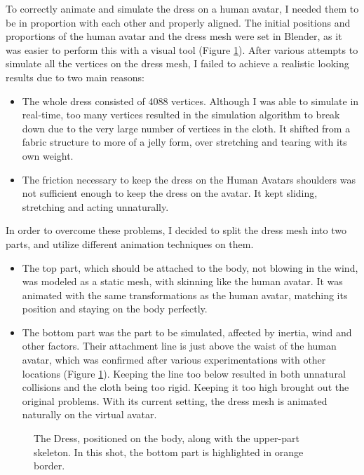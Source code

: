 To correctly animate and simulate the dress on a human avatar, I needed them to be in proportion with each other and properly aligned. The initial positions and proportions of the human avatar and the dress mesh were set in Blender, as it was easier to perform this with a visual tool (Figure \ref{fig:dress_and_body}).
After various attempts to simulate all the vertices on the dress mesh, I failed to achieve a realistic looking results due to two main reasons:
\begin{itemize}
  \item The whole dress consisted of 4088 vertices. Although I was able to simulate in real-time, too many vertices resulted in the simulation algorithm to break down due to the very large number of vertices in the cloth. It shifted from a fabric structure to more of a jelly form, over stretching and tearing with its own weight.
  \item The friction necessary to keep the dress on the Human Avatars shoulders was not sufficient enough to keep the dress on the avatar. It kept sliding, stretching and acting unnaturally.
\end{itemize}

In order to overcome these problems, I decided to split the dress mesh into two parts, and utilize different animation techniques on them.

\begin{itemize}
  \item The top part, which should be attached to the body, not blowing in the wind, was modeled as a static mesh, with skinning like the human avatar. It was animated with the same transformations as the human avatar, matching its position and staying on the body perfectly.
  \item The bottom part was the part to be simulated, affected by inertia, wind and other factors. Their attachment line is just above the waist of the human avatar, which was confirmed after various experimentations with other locations (Figure \ref{fig:dress_and_body}). Keeping the line too below resulted in both unnatural collisions and the cloth being too rigid. Keeping it too high brought out the original problems. With its current setting, the dress mesh is animated naturally on the virtual avatar.
\end{itemize}

\begin{figure}[h]
\centerline{}
\caption{The  Dress, positioned on the body, along with the upper-part skeleton. In this shot, the bottom part is highlighted in orange border.}
\label{fig:dress_and_body}
\end{figure}

